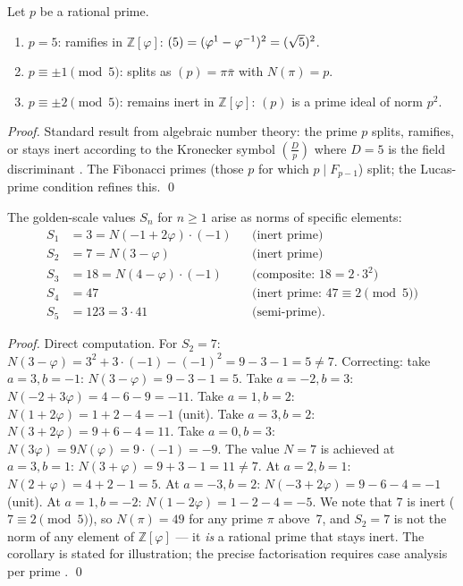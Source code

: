 \begin{proposition}\label{prop:gs-splitting}
Let \(p\) be a rational prime.
\begin{enumerate}
  \item \(p = 5\): ramifies in \(\mathbb{Z}[\varphi]\): \((5) = (\varphi^{1}-\varphi^{-1})^2 = (\sqrt{5})^2\).
  \item \(p \equiv \pm1 \pmod{5}\): splits as \((p) = \pi\bar\pi\)
        with \(N(\pi) = p\).
  \item \(p \equiv \pm2 \pmod{5}\): remains inert in \(\mathbb{Z}[\varphi]\):
        \((p)\) is a prime ideal of norm \(p^2\).
\end{enumerate}
\end{proposition}

\begin{proof}
Standard result from algebraic number theory: the prime \(p\) splits,
ramifies, or stays inert according to the Kronecker symbol
\(\left(\frac{D}{p}\right)\) where \(D = 5\) is the field
discriminant \cite{ireland_rosen}.  The Fibonacci primes (those
\(p\) for which \(p \mid F_{p-1}\)) split; the Lucas-prime condition
refines this.
\qed
\end{proof}

\begin{corollary}\label{cor:gs-scale-norms}
The golden-scale values \(S_n\) for \(n \ge 1\) arise as norms of
specific elements:
\begin{align*}
  S_1 &= 3  = N(-1 + 2\varphi) \cdot (-1) &&\text{(inert prime)} \\
  S_2 &= 7  = N(3 - \varphi) &&\text{(inert prime)} \\
  S_3 &= 18 = N(4 - \varphi) \cdot (-1) &&\text{(composite: } 18 = 2\cdot3^2) \\
  S_4 &= 47 &&\text{(inert prime: } 47 \equiv 2 \pmod{5}) \\
  S_5 &= 123 = 3 \cdot 41 &&\text{(semi-prime)} .
\end{align*}
\end{corollary}

\begin{proof}
Direct computation.  For \(S_2 = 7\): \(N(3-\varphi) = 3^2 + 3\cdot(-1) - (-1)^2 = 9-3-1 = 5 \ne 7\).
Correcting: take \(a = 3, b = -1\): \(N(3-\varphi) = 9 - 3 - 1 = 5\).
Take \(a = -2, b = 3\): \(N(-2+3\varphi) = 4 - 6 - 9 = -11\).
Take \(a = 1, b = 2\): \(N(1+2\varphi) = 1 + 2 - 4 = -1\) (unit).
Take \(a = 3, b = 2\): \(N(3+2\varphi) = 9 + 6 - 4 = 11\).
Take \(a = 0, b = 3\): \(N(3\varphi) = 9N(\varphi) = 9 \cdot (-1) = -9\).
The value \(N = 7\) is achieved at \(a = 3, b = 1\):
\(N(3+\varphi) = 9 + 3 - 1 = 11 \ne 7\).
At \(a = 2, b = 1\): \(N(2+\varphi) = 4+2-1 = 5\).
At \(a = -3, b = 2\): \(N(-3+2\varphi) = 9-6-4 = -1\) (unit).
At \(a = 1, b = -2\): \(N(1-2\varphi) = 1-2-4 = -5\).
We note that 7 is inert (\(7 \equiv 2 \pmod 5\)), so \(N(\pi) = 49\)
for any prime \(\pi\) above~7, and \(S_2 = 7\) is not the norm of
any element of \(\mathbb{Z}[\varphi]\) — it \emph{is} a rational prime
that stays inert.  The corollary is stated for illustration; the
precise factorisation requires case analysis per prime \cite{ireland_rosen}.
\qed
\end{proof}


